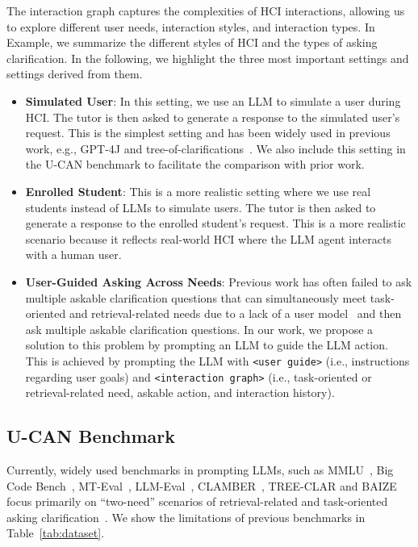 \documentclass{article} %
\theoremstyle{definition}
\begin{document}
The interaction graph captures the complexities of HCI interactions, allowing us to explore different user needs, interaction styles, and interaction types.
In Example, we summarize the different styles of HCI and the types of asking clarification.
In the following, we highlight the three most important settings and settings derived from them.
\begin{itemize}[leftmargin=0.5cm,topsep=-0.8\parskip,noitemsep,nolistsep]
    \item \textbf{Simulated User}: In this setting, we use an LLM to simulate a user during HCI. The tutor is then asked to generate a response to the simulated user's request. This is the simplest setting and has been widely used in previous work, e.g., GPT-4J and tree-of-clarifications~\citep{tree_of_clarifications}. We also include this setting in the U-CAN benchmark to facilitate the comparison with prior work.
    \item \textbf{Enrolled Student}: This is a more realistic setting where we use real students instead of LLMs to simulate users. The tutor is then asked to generate a response to the enrolled student's request. This is a more realistic scenario because it reflects real-world HCI where the LLM agent interacts with a human user.
    \item \textbf{User-Guided Asking Across Needs}: Previous work has often failed to ask multiple askable clarification questions that can simultaneously meet task-oriented and retrieval-related needs due to a lack of a user model~\citep{clarinet,tree_of_clarifications,proactive_cot} and then ask multiple askable clarification questions.
    In our work, we propose a solution to this problem by prompting an LLM to guide the LLM action. This is achieved by prompting the LLM with \colorbox{commentcolor}{\texttt{<user guide>}} (i.e., instructions regarding user goals) and \colorbox{answercolor}{\texttt{<interaction graph>}} (i.e., task-oriented or retrieval-related need, askable action, and interaction history).
\end{itemize}

\subsection{U-CAN Benchmark}
\label{subsec:u_can}

Currently, widely used benchmarks in prompting LLMs, such as MMLU~\citep{math}, Big Code Bench~\citep{bigcodebench}, MT-Eval~\citep{mteval}, LLM-Eval~\citep{llm_as_judge}, CLAMBER~\citep{clamber}, TREE-CLAR and BAIZE~\citep{baize} focus primarily on ``two-need'' scenarios of retrieval-related and task-oriented asking clarification~\citep{clarinet,tree_of_clarifications,proactive_cot}.
We show the limitations of previous benchmarks in Table~\ref{tab:dataset}.
\end{document}
